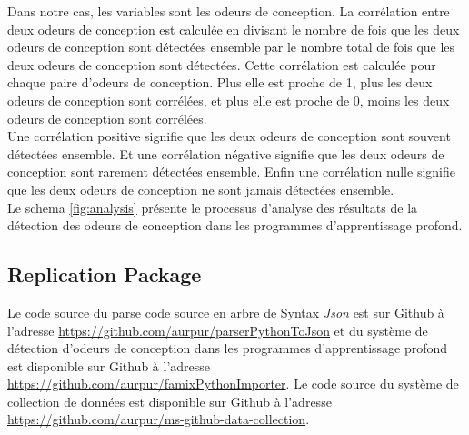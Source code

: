Dans notre cas, les variables sont les odeurs de conception. La corrélation entre deux odeurs de conception est
calculée en divisant le nombre de fois que les deux odeurs de conception sont
détectées ensemble par le nombre total de fois que les deux odeurs de conception
sont détectées. Cette corrélation est calculée pour chaque paire d'odeurs de
conception. Plus elle est proche de 1, plus les deux odeurs de conception sont
corrélées, et plus elle est proche de 0, moins les deux odeurs de conception
sont corrélées.\\

Une corrélation positive signifie que les deux odeurs de conception
sont souvent détectées ensemble. Et une corrélation négative signifie que les deux odeurs de conception sont rarement
détectées ensemble. Enfin une corrélation nulle signifie que les deux odeurs de
conception ne sont jamais détectées ensemble.\\

Le schema \ref{fig:analysis} présente le processus d'analyse des résultats de la
détection des odeurs de conception dans les programmes d'apprentissage
profond.\\

\subsection{Replication Package}
\label{sec:Replication Package}
Le code source du parse code source en arbre de Syntax \emph{Json} est sur
Github à l'adresse \url{https://github.com/aurpur/parserPythonToJson} et du
système de détection d'odeurs de conception dans les programmes d'apprentissage
profond est disponible sur Github à l'adresse
\url{https://github.com/aurpur/famixPythonImporter}. Le code source du système
de collection de données est disponible sur Github à l'adresse
\url{https://github.com/aurpur/ms-github-data-collection}.\\
